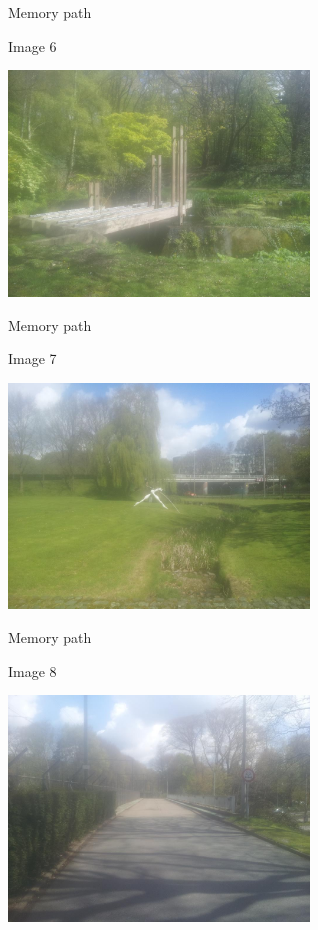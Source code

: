 \begin{frame}{Memory path}
  \begin{block}{Image 6}
    \begin{center}
      \includegraphics[height=6cm]{img/loci/06.jpg}
    \end{center}
  \end{block}
\end{frame}

\begin{frame}{Memory path}
  \begin{block}{Image 7}
    \begin{center}
      \includegraphics[height=6cm]{img/loci/07.jpg}
    \end{center}
  \end{block}
\end{frame}

\begin{frame}{Memory path}
  \begin{block}{Image 8}
    \begin{center}
      \includegraphics[height=6cm]{img/loci/08.jpg}
    \end{center}
  \end{block}
\end{frame}

